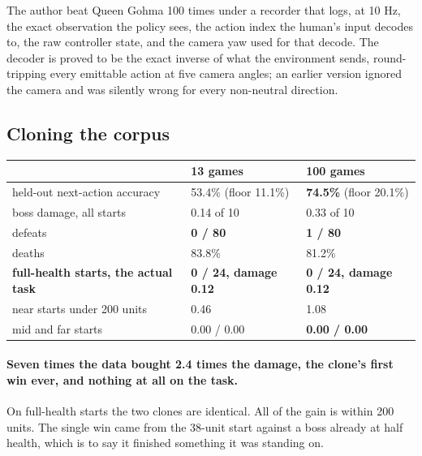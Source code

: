 \documentclass[11pt]{article}
\begin{document}
The author beat Queen Gohma 100 times under a recorder that logs, at 10 Hz, the exact observation the policy sees, the action index the human's input decodes to, the raw controller state, and the camera yaw used for that decode. The decoder is proved to be the exact inverse of what the environment sends, round-tripping every emittable action at five camera angles; an earlier version ignored the camera and was silently wrong for every non-neutral direction.

\subsection{Cloning the corpus}
\label{sec:6.1}

\begin{table}[!htbp]
  \centering
  \label{tab:thebehaviourcloneagainstthes}
\begin{center}\small
\begin{tabularx}{\linewidth}{@{}XXX@{}}
\toprule
\textbf{} & \textbf{13 games} & \textbf{100 games} \\
\midrule
held-out next-action accuracy & 53.4\% (floor 11.1\%) & \textbf{74.5\%} (floor 20.1\%) \\
boss damage, all starts & 0.14 of 10 & 0.33 of 10 \\
defeats & \textbf{0 / 80} & \textbf{1 / 80} \\
deaths & 83.8\% & 81.2\% \\
\textbf{full-health starts, the actual task} & \textbf{0 / 24, damage 0.12} & \textbf{0 / 24, damage 0.12} \\
near starts under 200 units & 0.46 & 1.08 \\
mid and far starts & 0.00 / 0.00 & \textbf{0.00 / 0.00} \\
\bottomrule
\end{tabularx}
\end{center}
\end{table}

\paragraph{Seven times the data bought 2.4 times the damage, the clone's first win ever, and nothing at all on the task.} On full-health starts the two clones are identical. All of the gain is within 200 units. The single win came from the 38-unit start against a boss already at half health, which is to say it finished something it was standing on.
\end{document}
